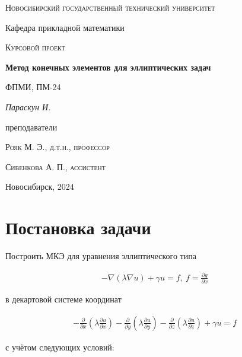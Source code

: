 \documentclass[12pt, a4paper]{article}
\begin{document}
\begin{titlepage}
  \centering
  \textsc{Новосибирский государственный технический университет}\par
  \vspace{1mm}
  Кафедра прикладной математики\par
  \vspace{4cm}
  \textsc{Курсовой проект}\par
  {\huge\bfseries Метод конечных элементов для эллиптических задач\par}
  \vspace{1cm}
  {\scriptsize ФПМИ, ПМ-24\par}
  \vspace{1mm}
  {\itshape\large Параскун И.\par}
  \vfill
  {\small преподаватели\par}
  \vspace{2mm}
  \textsc{Рояк М. Э., д.т.н., профессор}\par
  \vspace{1mm}
  \textsc{Сивенкова А. П., ассистент}\par
  \vfill
  \large{Новосибирск, 2024}
\end{titlepage}

\newpage

\setcounter{page}{2}
\tableofcontents

\newpage

\section{Постановка задачи}
Построить МКЭ для уравнения эллиптического типа

\begin{align}
  \label{1} -\nabla(\lambda\nabla u) + \gamma u = f, \ f = \frac{\partial{g}}{\partial{x}}
\end{align}

\noindent в декартовой системе координат

\begin{align}
  -\frac{\partial}{\partial{x}}(\lambda \frac{\partial{u}}{\partial{x}})
    -\frac{\partial}{\partial{y}}(\lambda \frac{\partial{u}}{\partial{y}})
    -\frac{\partial}{\partial{z}}(\lambda \frac{\partial{u}}{\partial{z}})
    + \gamma u = f
\end{align}

\vspace{5mm}
\noindent с учётом следующих условий:
\end{document}
